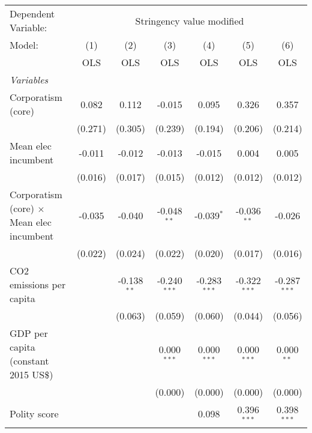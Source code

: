 
\begingroup
\centering
\begin{tabular}{lcccccc}
   \toprule
   Dependent Variable: & \multicolumn{6}{c}{Stringency value modified}\\
   Model:                                           & (1)     & (2)           & (3)            & (4)            & (5)            & (6)\\  
                                                    &  OLS    & OLS           & OLS            & OLS            & OLS            & OLS\\  
   \midrule
   \emph{Variables}\\
   Corporatism (core)                               & 0.082   & 0.112         & -0.015         & 0.095          & 0.326          & 0.357\\   
                                                    & (0.271) & (0.305)       & (0.239)        & (0.194)        & (0.206)        & (0.214)\\   
   Mean elec incumbent                              & -0.011  & -0.012        & -0.013         & -0.015         & 0.004          & 0.005\\   
                                                    & (0.016) & (0.017)       & (0.015)        & (0.012)        & (0.012)        & (0.012)\\   
   Corporatism (core) $\times$ Mean elec incumbent  & -0.035  & -0.040        & -0.048$^{**}$  & -0.039$^{*}$   & -0.036$^{**}$  & -0.026\\   
                                                    & (0.022) & (0.024)       & (0.022)        & (0.020)        & (0.017)        & (0.016)\\   
   CO2 emissions per capita                         &         & -0.138$^{**}$ & -0.240$^{***}$ & -0.283$^{***}$ & -0.322$^{***}$ & -0.287$^{***}$\\   
                                                    &         & (0.063)       & (0.059)        & (0.060)        & (0.044)        & (0.056)\\   
   GDP per capita (constant 2015 US\$)              &         &               & 0.000$^{***}$  & 0.000$^{***}$  & 0.000$^{***}$  & 0.000$^{**}$\\   
                                                    &         &               & (0.000)        & (0.000)        & (0.000)        & (0.000)\\   
   Polity score                                     &         &               &                & 0.098          & 0.396$^{***}$  & 0.398$^{***}$\\   

\end{tabular}
